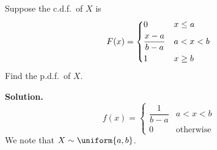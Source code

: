 \begin{Example}{}{}
    Suppose the c.d.f.\ of $ X $ is
    \[ F(x)=\begin{dcases}
            0               & x\le a \\
            \frac{x-a}{b-a} & a<x<b  \\
            1               & x\ge b
        \end{dcases} \]
    Find the p.d.f.\ of $ X $.

    \textbf{Solution.}
    \[ f(x)=
        \begin{cases}
            \dfrac{1}{b-a} & a<x<b            \\
            0              & \text{otherwise}
        \end{cases} \]
    We note that $ X \sim \uniform{a,b} $.
\end{Example}

